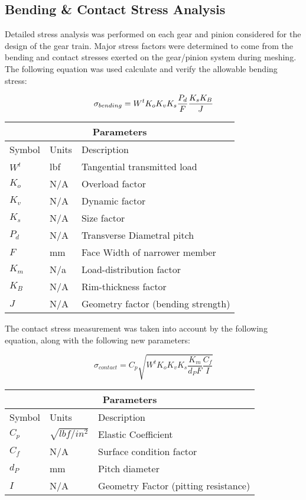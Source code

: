 \documentclass[letterpaper,12pt]{article}
\begin{document}
\subsection{Bending \& Contact Stress Analysis}

Detailed stress analysis was performed on each gear and pinion considered for the design of the gear train. Major stress factors were determined to come from the bending and contact stresses exerted on the gear/pinion system during meshing. The following equation was used calculate and verify the allowable bending stress:

    \begin{equation}
        \sigma_{bending} = W^t K_o K_v K_s \frac{P_d}{F}\frac{K_s K_B}{J} \\
    \end{equation}

    \begin{center}
		\begin{tabular}{ |p{2cm}||p{2cm}|p{7cm}|  }
			\hline
			\multicolumn{3}{|c|}{Parameters} \\
			\hline
			Symbol & Units & Description\\
			\hline
			$W^t$ & lbf & Tangential transmitted load\\
			$K_o$ & N/A & Overload factor\\
			$K_v$ & N/A &  Dynamic factor\\
			$K_s$ & N/A & Size factor\\
			$P_{d}$ & N/A & Transverse Diametral pitch\\
			$F$ & mm & Face Width of narrower member\\
			$K_m$ & N/a & Load-distribution factor\\
			$K_{B}$ & N/A & Rim-thickness factor\\
			$J$ & N/A & Geometry factor (bending strength)\\
			\hline
		\end{tabular}
	\end{center}
	
\newpage \noindent
The contact stress measurement was taken into account by the following equation, along with the following new parameters:

	\begin{equation}
	    \sigma_{contact} = C_{p}\sqrt{W^t K_o K_v K_s \frac{K_m}{d_P F}\frac{C_f}{I}}
	\end{equation}
	
	\begin{center}
	    \begin{tabular}{ |p{2cm}||p{2cm}|p{7cm}|  }
			\hline
			\multicolumn{3}{|c|}{Parameters} \\
			\hline
			Symbol & Units & Description\\
			\hline
			$C_p$ & $\sqrt{lbf/in^2}$ & Elastic Coefficient\\
			$C_f$ & N/A & Surface condition factor\\
			$d_P$ & mm & Pitch diameter\\
			$I$ & N/A & Geometry Factor (pitting resistance)\\
			\hline
		\end{tabular}
	\end{center}
\end{document}
